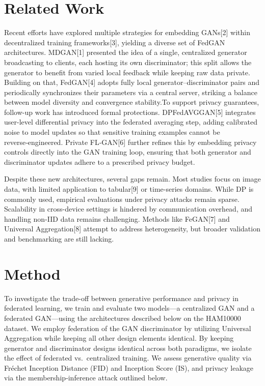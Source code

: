 \documentclass{article}
\begin{document}
\section{Related Work}

Recent efforts have explored multiple strategies for embedding GANs[2] within decentralized training frameworks[3], yielding a diverse set of FedGAN architectures. MDGAN[1] presented the idea of a single, centralized generator broadcasting to clients, each hosting its own discriminator; this split allows the generator to benefit from varied local feedback while keeping raw data private. Building on that, FedGAN[4] adopts fully local generator–discriminator pairs and periodically synchronizes their parameters via a central server, striking a balance between model diversity and convergence stability.To support privacy guarantees, follow-up work has introduced formal protections. DPFedAVGGAN[5] integrates user-level differential privacy into the federated averaging step, adding calibrated noise to model updates so that sensitive training examples cannot be reverse‑engineered. Private FL‑GAN[6] further refines this by embedding privacy controls directly into the GAN training loop, ensuring that both generator and discriminator updates adhere to a prescribed privacy budget.

Despite these new architectures, several gaps remain. Most studies focus on image data, with limited application to tabular[9] or time-series domains. While DP is commonly used, empirical evaluations under privacy attacks remain sparse. Scalability in cross-device settings is hindered by communication overhead, and handling non-IID data remains challenging. Methods like FeGAN[7] and Universal Aggregation[8] attempt to address heterogeneity, but broader validation and benchmarking are still lacking.

\section{Method}
To investigate the trade-off between generative performance and privacy in federated learning, we train and evaluate two models—a centralized GAN and a federated GAN—using the architectures described below on the HAM10000 dataset. We employ federation of the GAN discriminator by utilizing Universal Aggregation while keeping all other design elements identical. By keeping generator and discriminator designs identical across both paradigms, we isolate the effect of federated vs.\ centralized training. We assess generative quality via Fréchet Inception Distance (FID) and Inception Score (IS), and privacy leakage via the membership‑inference attack outlined below.
\end{document}
